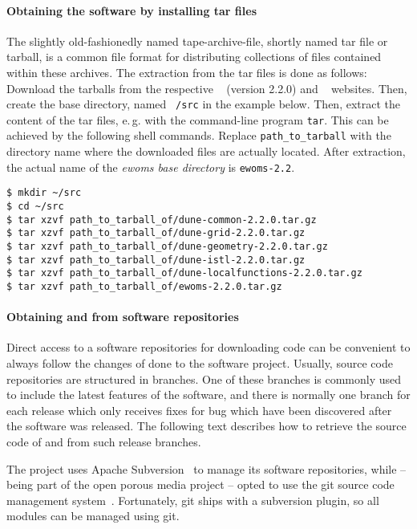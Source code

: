 \paragraph{Obtaining the software by installing tar files}

The slightly old-fashionedly named tape-archive-file, shortly named
tar file or tarball, is a common file format for distributing
collections of files contained within these archives.  The extraction
from the tar files is done as follows: Download the tarballs from the
respective \Dune~\cite{DUNE-HP} (version 2.2.0) and
\eWoms~\cite{EWOMS-HP} websites.  Then, create the {\Dune} base
directory, named \texttt{~/src} in the example below. Then, extract the
content of the tar files, e.\,g. with the command-line program
\texttt{tar}.  This can be achieved by the following shell
commands. Replace \texttt{path\_to\_tarball} with the directory name
where the downloaded files are actually located.  After extraction,
the actual name of the \emph{ewoms base directory} is
\texttt{ewoms-2.2}.

\begin{lstlisting}[style=Bash]
$ mkdir ~/src
$ cd ~/src
$ tar xzvf path_to_tarball_of/dune-common-2.2.0.tar.gz 
$ tar xzvf path_to_tarball_of/dune-grid-2.2.0.tar.gz 
$ tar xzvf path_to_tarball_of/dune-geometry-2.2.0.tar.gz 
$ tar xzvf path_to_tarball_of/dune-istl-2.2.0.tar.gz 
$ tar xzvf path_to_tarball_of/dune-localfunctions-2.2.0.tar.gz 
$ tar xzvf path_to_tarball_of/ewoms-2.2.0.tar.gz
\end{lstlisting}

\paragraph{Obtaining \Dune and \eWoms from software repositories} 

Direct access to a software repositories for downloading code can be
convenient to always follow the changes of done to the software
project. Usually, source code repositories are structured in
branches. One of these branches is commonly used to include the latest
features of the software, and there is normally one branch for each
release which only receives fixes for bug which have been discovered
after the software was released. The following text describes how to
retrieve the source code of \Dune and \eWoms from such release
branches.

The \Dune project uses Apache Subversion~\cite{APACHE-SUBVERSION-HP}
to manage its software repositories, while \eWoms -- being part of the
open porous media project -- opted to use the git source code
management system~\cite{GIT-HP}. Fortunately, git ships with a
subversion plugin, so all modules can be managed using git.

